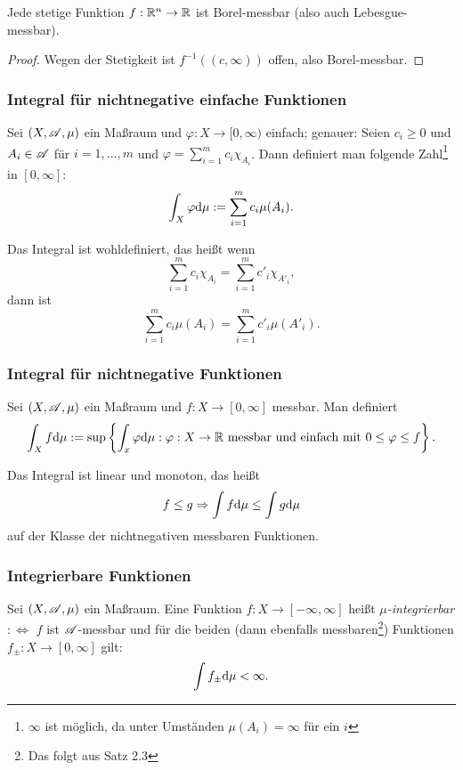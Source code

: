 \documentclass[
 a4paper,
 12pt,
 parskip=half
 ]{scrartcl}
\theoremstyle{plain}
\theoremstyle{definition}
\numberwithin{equation}{section}
\begin{document}
\begin{bem}
 Jede stetige Funktion $f:\mathbb{R}^n \to \mathbb{R}$ ist Borel-messbar (also auch Lebesgue-messbar).
\end{bem}

\begin{proof}
 Wegen der Stetigkeit ist $f^{-1}((c,\infty))$ offen, also Borel-messbar.
\end{proof}

\subsubsection{Integral für nichtnegative einfache Funktionen}
Sei $(X,\mathscr{A},\mu)$ ein Maßraum und $\varphi: X \to [0, \infty)$ einfach; genauer: Seien $c_i \ge 0$ und $A_i \in \mathscr{A}$ für $i=1,\ldots,m$ und $\varphi = \sum_{i=1}^m c_i \chi_{A_i}$. Dann definiert man folgende Zahl\footnote{{$\infty$ ist möglich, da unter Umständen $\mu(A_i) = \infty$ für ein $i$}} in $[0,\infty]$:
\[ \int_X \varphi \mathrm{d} \mu := \sum_{i=1}^m c_i \mu( A_i ). \]

\begin{bem}
 Das Integral ist wohldefiniert, das heißt wenn
 \[ \sum_{i=1}^m c_i \chi_{A_i} = \sum_{i=1}^m c'_i \chi_{A'_i}, \]
 dann ist 
 \[ \sum_{i=1}^m c_i \mu(A_i) = \sum_{i=1}^m c'_i \mu(A'_i). \]
\end{bem}

\subsubsection{Integral für nichtnegative Funktionen}
Sei $(X,\mathscr{A},\mu)$ ein Maßraum und $f: X \to [0, \infty]$ messbar. Man definiert
\[ \int_X f \mathrm{d} \mu := \sup \left\{ \int_x \varphi \mathrm{d} \mu : \varphi: X \to \mathbb{R} \text{ messbar und einfach mit } 0 \le \varphi \le f \right\}. \]

\begin{bem}
 Das Integral ist linear und monoton, das heißt
 \[ f \le g \Rightarrow \int f \mathrm{d} \mu \le \int g \mathrm{d} \mu \]
 auf der Klasse der nichtnegativen messbaren Funktionen.
\end{bem}

\subsubsection{Integrierbare Funktionen}
Sei $(X,\mathscr{A},\mu)$ ein Maßraum. Eine Funktion $f:X \to [-\infty,\infty]$ heißt \emph{$\mu$-integrierbar} $:\Leftrightarrow$ $f$ ist $\mathscr{A}$-messbar und für die beiden (dann ebenfalls messbaren\footnote{Das folgt aus Satz 2.3}) Funktionen $f_\pm : X \to [0,\infty]$ gilt:
\[ \int f_\pm \mathrm{d} \mu < \infty. \]
\end{document}

